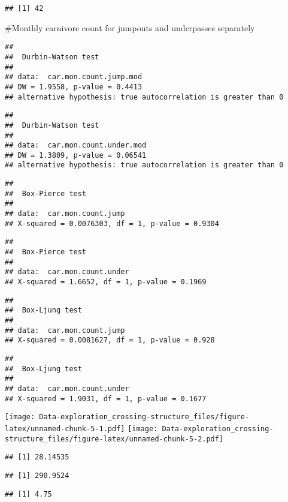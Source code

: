\documentclass[]{article}
\begin{document}
\begin{verbatim}
## [1] 42
\end{verbatim}

\#Monthly carnivore count for jumpouts and underpasses separately

\begin{verbatim}
## 
##  Durbin-Watson test
## 
## data:  car.mon.count.jump.mod
## DW = 1.9558, p-value = 0.4413
## alternative hypothesis: true autocorrelation is greater than 0
\end{verbatim}

\begin{verbatim}
## 
##  Durbin-Watson test
## 
## data:  car.mon.count.under.mod
## DW = 1.3809, p-value = 0.06541
## alternative hypothesis: true autocorrelation is greater than 0
\end{verbatim}

\begin{verbatim}
## 
##  Box-Pierce test
## 
## data:  car.mon.count.jump
## X-squared = 0.0076303, df = 1, p-value = 0.9304
\end{verbatim}

\begin{verbatim}
## 
##  Box-Pierce test
## 
## data:  car.mon.count.under
## X-squared = 1.6652, df = 1, p-value = 0.1969
\end{verbatim}

\begin{verbatim}
## 
##  Box-Ljung test
## 
## data:  car.mon.count.jump
## X-squared = 0.0081627, df = 1, p-value = 0.928
\end{verbatim}

\begin{verbatim}
## 
##  Box-Ljung test
## 
## data:  car.mon.count.under
## X-squared = 1.9031, df = 1, p-value = 0.1677
\end{verbatim}

\texttt{[image: Data-exploration\_crossing-structure\_files/figure-latex/unnamed-chunk-5-1.pdf]}
\texttt{[image: Data-exploration\_crossing-structure\_files/figure-latex/unnamed-chunk-5-2.pdf]}

\begin{verbatim}
## [1] 28.14535
\end{verbatim}

\begin{verbatim}
## [1] 290.9524
\end{verbatim}

\begin{verbatim}
## [1] 4.75
\end{verbatim}
\end{document}
